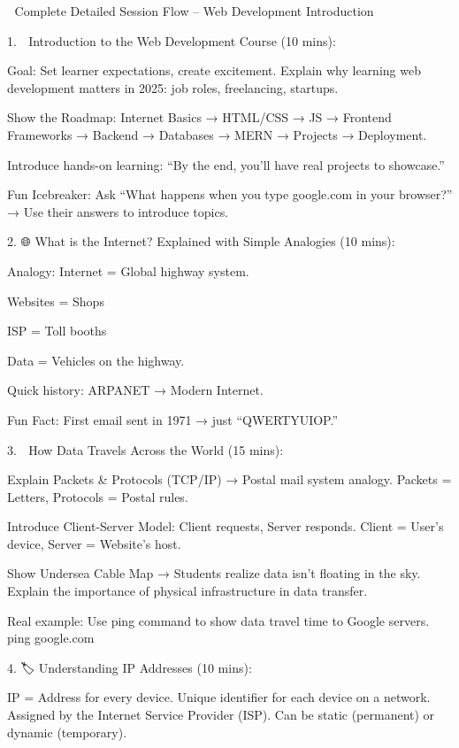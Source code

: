 📝 Complete Detailed Session Flow – Web Development Introduction

    1. 🚀 Introduction to the Web Development Course (10 mins):

        Goal: Set learner expectations, create excitement.
            Explain why learning web development matters in 2025: job roles, freelancing, startups.

                Show the Roadmap: Internet Basics → HTML/CSS → JS → Frontend Frameworks → Backend → Databases → MERN → Projects → Deployment.

                Introduce hands-on learning: “By the end, you’ll have real projects to showcase.”

                Fun Icebreaker: Ask “What happens when you type google.com in your browser?” → Use their answers to introduce topics.


    2. 🌐 What is the Internet? Explained with Simple Analogies (10 mins):


            Analogy: Internet = Global highway system.

            Websites = Shops

            ISP = Toll booths

            Data = Vehicles on the highway.

            Quick history: ARPANET → Modern Internet.

            Fun Fact: First email sent in 1971 → just “QWERTYUIOP.”


    3. 📡 How Data Travels Across the World (15 mins):


        Explain Packets & Protocols (TCP/IP) → Postal mail system analogy.
            Packets = Letters, Protocols = Postal rules.

        Introduce Client-Server Model: Client requests, Server responds.
            Client = User's device, Server = Website's host.

        Show Undersea Cable Map → Students realize data isn’t floating in the sky.
            Explain the importance of physical infrastructure in data transfer.
            
        

        Real example: Use ping command to show data travel time to Google servers.
            ping google.com



    4. 🏷️ Understanding IP Addresses (10 mins):

        IP = Address for every device.
            Unique identifier for each device on a network.
            Assigned by the Internet Service Provider (ISP).
            Can be static (permanent) or dynamic (temporary).



